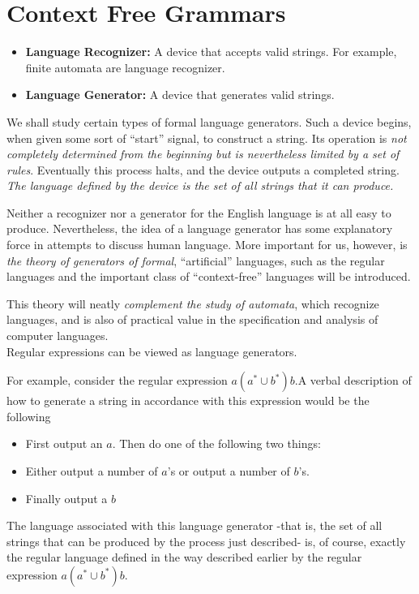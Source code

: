\section{Context Free Grammars}

\begin{multicols*}{2}
\setlength{\columnsep}{1.5cm}
\setlength{\columnseprule}{0.2pt}

\begin{itemize}
  \item \textbf{Language Recognizer:} A device that accepts valid strings. For example, finite automata are language recognizer.
  \item \textbf{Language Generator:} A device that generates valid strings.
\end{itemize}

We shall study certain types of formal language generators. Such a device begins, when given some sort of ``start'' signal, to construct a string. Its operation is \textit{not completely determined from the beginning but is nevertheless limited by a set of rules}. Eventually this process halts, and the device outputs a completed string. \textit{The language defined by the device is the set of all strings that it can produce.}

Neither a recognizer nor a generator for the English language is at all easy
to produce. Nevertheless, the idea of a language generator has some explanatory force in attempts to discuss human language. More important for us, however, is \textit{the theory of generators of formal}, ``artificial'' languages, such as the regular languages and the important class of ``context-free'' languages will be introduced.

This theory will neatly \textit{complement the study of automata}, which recognize languages, and is also of practical value in the specification and analysis of computer languages.\\

Regular expressions can be viewed as language generators. 

\noindent For example, consider the regular expression $a(a^* \cup b^*)b$.A verbal description of how to generate a string in accordance with this expression would be the following
\begin{itemize}
  \item First output an $a$. Then do one of the following two things:
  \item Either output a number of $a$'s or output a number of $b$'s.
  \item Finally output a $b$
\end{itemize}
The language associated with this language generator -that is, the set of
all strings that can be produced by the process just described- is, of course, exactly the regular language defined in the way described earlier by the regular expression $a(a^* \cup b^*)b$. 


\end{multicols*}
